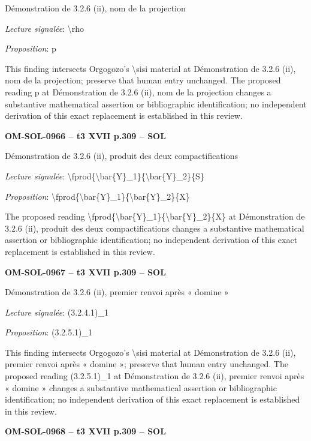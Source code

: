 Démonstration de 3.2.6 (ii), nom de la projection\par
\emph{Lecture signalée}: \textbackslash{}rho\par
\emph{Proposition}: p\par
This finding intersects Orgogozo's \textbackslash{}sisi material at Démonstration de 3.2.6 (ii), nom de la projection; preserve that human entry unchanged. The proposed reading p at Démonstration de 3.2.6 (ii), nom de la projection changes a substantive mathematical assertion or bibliographic identification; no independent derivation of this exact replacement is established in this review.\par
\par\noindent\textbf{OM-SOL-0966 -- t3 XVII p.309 -- SOL}\par
Démonstration de 3.2.6 (ii), produit des deux compactifications\par
\emph{Lecture signalée}: \textbackslash{}fprod\{\textbackslash{}bar\{Y\}\_1\}\{\textbackslash{}bar\{Y\}\_2\}\{S\}\par
\emph{Proposition}: \textbackslash{}fprod\{\textbackslash{}bar\{Y\}\_1\}\{\textbackslash{}bar\{Y\}\_2\}\{X\}\par
The proposed reading \textbackslash{}fprod\{\textbackslash{}bar\{Y\}\_1\}\{\textbackslash{}bar\{Y\}\_2\}\{X\} at Démonstration de 3.2.6 (ii), produit des deux compactifications changes a substantive mathematical assertion or bibliographic identification; no independent derivation of this exact replacement is established in this review.\par
\par\noindent\textbf{OM-SOL-0967 -- t3 XVII p.309 -- SOL}\par
Démonstration de 3.2.6 (ii), premier renvoi après « domine »\par
\emph{Lecture signalée}: (3.2.4.1)\_1\par
\emph{Proposition}: (3.2.5.1)\_1\par
This finding intersects Orgogozo's \textbackslash{}sisi material at Démonstration de 3.2.6 (ii), premier renvoi après « domine »; preserve that human entry unchanged. The proposed reading (3.2.5.1)\_1 at Démonstration de 3.2.6 (ii), premier renvoi après « domine » changes a substantive mathematical assertion or bibliographic identification; no independent derivation of this exact replacement is established in this review.\par
\par\noindent\textbf{OM-SOL-0968 -- t3 XVII p.309 -- SOL}\par
